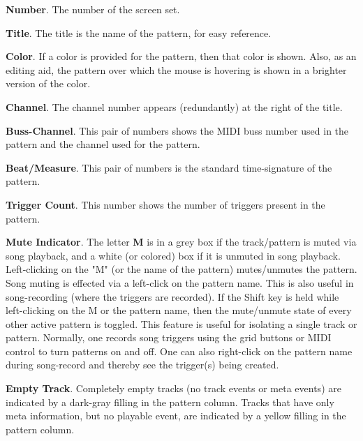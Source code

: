    \begin{enumber}
      \item \textbf{Number}.
         The number of the screen set.
      \item \textbf{Title}.
         The title is the name of the pattern, for easy reference.
      \item \textbf{Color}.
         If a color is provided for the pattern, then that color is shown.
         Also, as an editing aid, the pattern over which the mouse is hovering
         is shown in a brighter version of the color.
      \item \textbf{Channel}.
         The channel number appears (redundantly)
         at the right of the title.
      \item \textbf{Buss-Channel}.
         This pair of numbers shows the MIDI buss number used in the pattern
         and the channel used for the pattern.
      \item \textbf{Beat/Measure}.
         This pair of numbers is the standard time-signature of the pattern.
      \item \textbf{Trigger Count}.
         This number shows the number of triggers present in the pattern.
      \item \textbf{Mute Indicator}.
         The letter \textbf{M} is in a grey box if the track/pattern
         is muted via song playback,
         and a white (or colored) box if it is unmuted in song playback.
         Left-clicking on the "M" (or the name of the pattern)
         mutes/unmutes the pattern.
         Song muting is effected via a left-click on the pattern name.
         This is also useful in song-recording (where the triggers are recorded).
         If the Shift key is held while left-clicking on the M or the pattern
         name, then
         the mute/unmute state of every other active pattern is toggled.
         This feature is useful for isolating a single track or pattern.
         Normally, one records song triggers using the grid buttons or MIDI
         control to turn patterns on and off.
         One can also right-click on the pattern name during song-record and
         thereby see the trigger(s) being created.
      \item \textbf{Empty Track}.
         Completely empty tracks (no track events or meta events)
         are indicated by a dark-gray filling in the pattern column.
         Tracks that have only meta information, but no playable event, are
         indicated by a yellow filling in the pattern column.
   \end{enumber}

